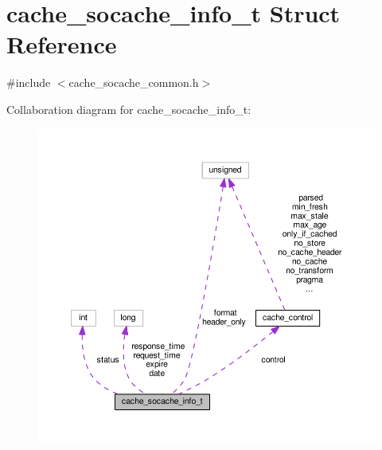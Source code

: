 \hypertarget{structcache__socache__info__t}{}\section{cache\+\_\+socache\+\_\+info\+\_\+t Struct Reference}
\label{structcache__socache__info__t}


{\ttfamily \#include $<$cache\+\_\+socache\+\_\+common.\+h$>$}



Collaboration diagram for cache\+\_\+socache\+\_\+info\+\_\+t\+:
\nopagebreak
\begin{figure}[H]
\begin{center}
\leavevmode
\includegraphics[width=350pt]{structcache__socache__info__t__coll__graph}
\end{center}
\end{figure}
